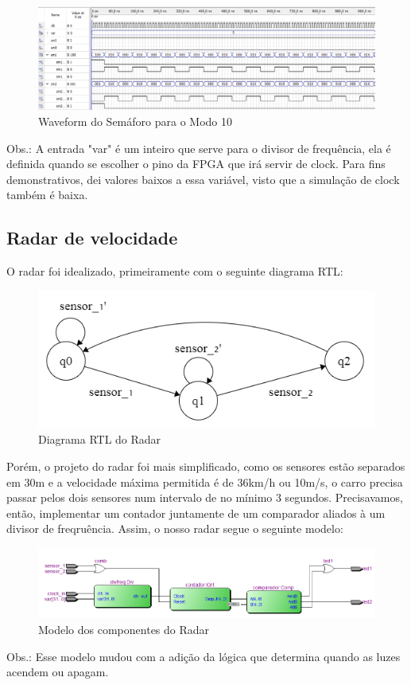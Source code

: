\begin{figure}
\caption{Waveform do Semáforo para o Modo 10}
\centering
\includegraphics[width=0.99\columnwidth]{waveformpisca.png}
\end{figure}
Obs.: A entrada "var" é um inteiro que serve para o divisor de frequência, ela é definida quando se escolher o pino da FPGA que irá servir de clock. Para fins demonstrativos, dei valores baixos a essa variável, visto que a simulação de clock também é baixa.

\subsection{Radar de velocidade}
\setlength{\parindent}{2cm}
O radar foi idealizado, primeiramente com o seguinte diagrama RTL:
\begin{figure}
\caption{Diagrama RTL do Radar}
\centering
\includegraphics[width=0.75\columnwidth]{0.png}
\end{figure}

Porém, o projeto do radar foi mais simplificado, como os sensores estão separados em 30m e a velocidade máxima permitida é de 36km/h ou 10m/s, o carro precisa passar pelos dois sensores num intervalo de no mínimo 3 segundos. Precisavamos, então, implementar um contador juntamente de um comparador aliados à um divisor de freqruência. Assim, o nosso radar segue o seguinte modelo:
\begin{figure}
\caption{Modelo dos componentes do Radar}
\centering
\includegraphics[width=0.99\columnwidth]{radar.png}
\end{figure}
Obs.: Esse modelo mudou com a adição da lógica que determina quando as luzes acendem ou apagam.

